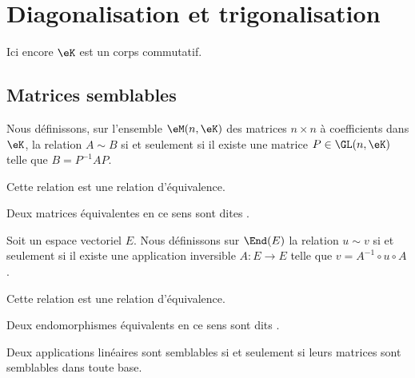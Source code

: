 

\section{Diagonalisation et trigonalisation}

Ici encore \( \eK\) est un corps commutatif.

\subsection{Matrices semblables}

\begin{propositionDef} \label{DefCQNFooSDhDpB}
	Nous définissons, sur l'ensemble \( \eM(n,\eK)\) des matrices \( n\times n\) à coefficients dans \(\eK\), la relation  \( A\sim B\) si et seulement si il existe une matrice \( P\in\GL(n,\eK)\) telle que \( B=P^{-1}AP\).

	Cette relation est une relation d'équivalence.

	Deux matrices équivalentes en ce sens sont dites .
\end{propositionDef}

\begin{propositionDef}      \label{PROPooIXFSooZsFWHm}
	Soit un espace vectoriel \( E\). Nous définissons sur \( \End(E)\) la relation \( u\sim v\) si et seulement si il existe une application inversible \( A\colon E\to E\) telle que \( v=A^{-1}\circ u\circ A\).

	Cette relation est une relation d'équivalence.

	Deux endomorphismes équivalents en ce sens sont dits .
\end{propositionDef}

\begin{proposition}     \label{PROPooBGJBooXlDYEv}
	Deux applications linéaires sont semblables si et seulement si leurs matrices sont semblables dans toute base.
\end{proposition}

